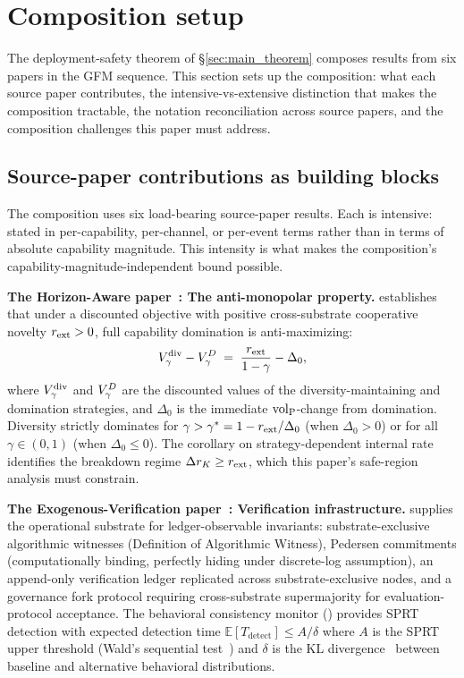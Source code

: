 \section{Composition setup}
\label{sec:composition_setup}

The deployment-safety theorem of \S\ref{sec:main_theorem} composes results from
six papers in the GFM sequence.  This section sets up the composition: what each
source paper contributes, the intensive-vs-extensive distinction that makes the
composition tractable, the notation reconciliation across source papers, and
the composition challenges this paper must address.

\subsection{Source-paper contributions as building blocks}
\label{sec:source_blocks}

The composition uses six load-bearing source-paper results.  Each is
intensive: stated in per-capability, per-channel, or per-event terms
rather than in terms of absolute capability magnitude.  This intensity
is what makes the composition's capability-magnitude-independent
bound possible.

\textbf{The Horizon-Aware paper~\citep{lasser2026horizon}: The anti-monopolar property.}
\citep[Proposition~6]{lasser2026horizon} establishes that under a
discounted objective with positive cross-substrate cooperative novelty
$r_{\mathrm{ext}} > 0$, full capability domination is anti-maximizing:
\[
  V_{\gamma}^{\mathrm{div}} - V_{\gamma}^{D} \;=\;
  \frac{r_{\mathrm{ext}}}{1 - \gamma} - \Delta_0,
\]
where $V_{\gamma}^{\mathrm{div}}$ and $V_{\gamma}^{D}$ are the discounted
values of the diversity-maintaining and domination strategies, and
$\Delta_0$ is the immediate ${\operatorname{vol}_{\mathrm{P}}}$-change from domination.
Diversity strictly dominates for $\gamma > \gamma^* = 1 -
r_{\mathrm{ext}}/\Delta_0$ (when $\Delta_0 > 0$) or for all $\gamma \in (0,1)$
(when $\Delta_0 \leq 0$). The corollary on strategy-dependent
internal rate identifies the breakdown regime $\Delta r_K \geq
r_{\mathrm{ext}}$, which this paper's safe-region analysis must constrain.

\textbf{The Exogenous-Verification paper~\citep{lasser2026exo}: Verification infrastructure.}
\citep{lasser2026exo} supplies the operational substrate for ledger-observable
invariants: substrate-exclusive algorithmic witnesses (Definition of
Algorithmic Witness), Pedersen commitments (computationally binding, perfectly
hiding under discrete-log assumption), an append-only verification ledger
replicated across substrate-exclusive nodes, and a governance fork protocol
requiring cross-substrate supermajority for evaluation-protocol acceptance. The
behavioral consistency monitor (\citep[Proposition~6]{lasser2026exo}) provides
SPRT detection with expected detection time $\mathbb{E}[T_{\mathrm{detect}}]
\leq A/\delta$ where $A$ is the SPRT upper threshold (Wald's sequential
test~\citep{wald1947sequential}) and $\delta$ is the KL
divergence~\citep{kullback1951information} between baseline and alternative
behavioral distributions.

